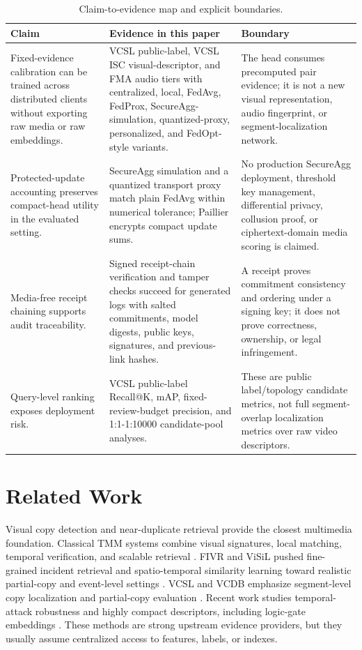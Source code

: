\documentclass[journal]{IEEEtran}
\begin{document}
\begin{table}[!t]
\centering
\caption{Claim-to-evidence map and explicit boundaries.}
\label{tab:claim-evidence}
\scriptsize
\begin{tabularx}{\textwidth}{p{} p{} X}
\toprule
Claim & Evidence in this paper & Boundary \\
\midrule
Fixed-evidence calibration can be trained across distributed clients without exporting raw media or raw embeddings. & VCSL public-label, VCSL ISC visual-descriptor, and FMA audio tiers with centralized, local, FedAvg, FedProx, SecureAgg-simulation, quantized-proxy, personalized, and FedOpt-style variants. & The head consumes precomputed pair evidence; it is not a new visual representation, audio fingerprint, or segment-localization network. \\
Protected-update accounting preserves compact-head utility in the evaluated setting. & SecureAgg simulation and a quantized transport proxy match plain FedAvg within numerical tolerance; Paillier encrypts compact update sums. & No production SecureAgg deployment, threshold key management, differential privacy, collusion proof, or ciphertext-domain media scoring is claimed. \\
Media-free receipt chaining supports audit traceability. & Signed receipt-chain verification and tamper checks succeed for generated logs with salted commitments, model digests, public keys, signatures, and previous-link hashes. & A receipt proves commitment consistency and ordering under a signing key; it does not prove correctness, ownership, or legal infringement. \\
Query-level ranking exposes deployment risk. & VCSL public-label Recall@K, mAP, fixed-review-budget precision, and 1:1-1:10000 candidate-pool analyses. & These are public label/topology candidate metrics, not full segment-overlap localization metrics over raw video descriptors. \\
\bottomrule
\end{tabularx}
\end{table}

\section{Related Work}

Visual copy detection and near-duplicate retrieval provide the closest multimedia foundation. Classical TMM systems combine visual signatures, local matching, temporal verification, and scalable retrieval \cite{wu2009realtime,douze2010image,chou2015pattern,song2013multiple,hao2017smvh}. FIVR and ViSiL pushed fine-grained incident retrieval and spatio-temporal similarity learning toward realistic partial-copy and event-level settings \cite{kordopatis2019fivr,kordopatis2019visil}. VCSL and VCDB emphasize segment-level copy localization and partial-copy evaluation \cite{feng2022vcsl,jiang2015vcdb}. Recent work studies temporal-attack robustness and highly compact descriptors, including logic-gate embeddings \cite{fojcik2025compact,fojcik2025temporal,fojcik2026logic}. These methods are strong upstream evidence providers, but they usually assume centralized access to features, labels, or indexes.
\end{document}
